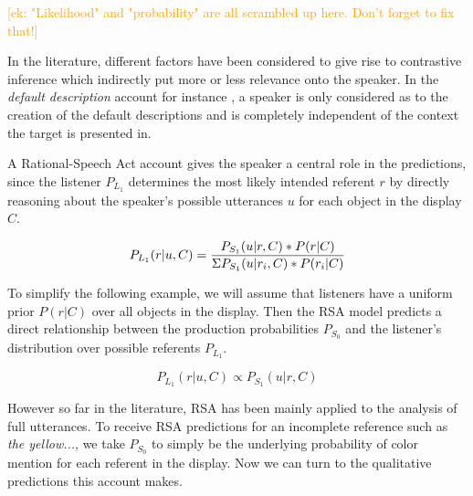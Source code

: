 \documentclass[10pt,letterpaper]{article}
\newcommand{\ek}[1]{\textcolor{Orange}{[ek: #1]}}
\begin{document}
\ek{"Likelihood" and "probability" are all scrambled up here. Don't forget to fix that!}

In the literature, different factors have been considered to give rise to contrastive inference which indirectly put more or less relevance onto the speaker. In the \emph{default description} account for instance \cite{Sedivy:1999}, a speaker is only considered as to the creation of the default descriptions and is completely independent of the context the target is presented in. 


A Rational-Speech Act account gives the speaker a central role in the predictions, since the listener $P_{L_1}$ determines the most likely intended referent $r$ by directly reasoning about the speaker's possible utterances $u$ for each object in the display $C$. 

\begin{equation}
	P_{L_1}(r|u,C) = \frac{P_{S_1}(u|r,C) * P(r|C)}{\Sigma \space P_{S_1}(u|r_{i},C) * P(r_{i}|C)}
\label{eq-prior}
\end{equation}

To simplify the following example, we will assume that listeners have a uniform prior $P(r|C)$ over all objects in the display. Then the RSA model predicts a direct relationship between the production probabilities $P_{S_0}$ and the listener's distribution over possible referents $P_{L_1}$. 

\begin{equation}
	P_{L_1}(r|u,C) \propto P_{S_1}(u|r,C)
\label{eq-prior}
\end{equation}

However so far in the literature, RSA has been mainly applied to the analysis of full utterances. To receive RSA predictions for an incomplete reference such as \textit{the yellow...}, we take $P_{S_0}$ to simply be the underlying probability of color mention for each referent in the display. Now we can turn to the qualitative predictions this account makes.
\end{document}
